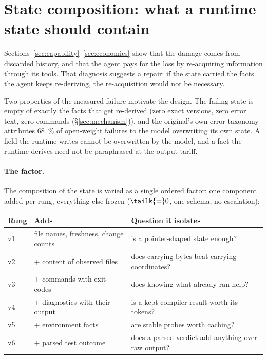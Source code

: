 %
%

\section{State composition: what a runtime state should contain}
\label{sec:composition}

Sections~\ref{sec:capability}--\ref{sec:economics} show that the damage comes
from discarded history, and that the agent pays for the loss by re-acquiring
information through its tools. That diagnosis suggests a repair: if the state
carried the facts the agent keeps re-deriving, the re-acquisition would not
be necessary.

Two properties of the measured failure motivate the design. The failing
state is empty of exactly the facts that get re-derived (zero exact versions,
zero error text, zero commands (\S\ref{sec:mechanism})), and the original's
own error taxonomy attributes \SI{68}{\percent} of open-weight failures to
the model overwriting its own state\origin. A field the runtime writes cannot
be overwritten by the model, and a fact the runtime derives need not be
paraphrased at the output tariff.

\paragraph{The factor.} The composition of the state is varied as a single
ordered factor: one component added per rung, everything else frozen
($\tailk{=}0$, one schema, no escalation):

\begin{center}
\begin{tabular}{@{}llp{7.2cm}@{}}
\toprule
Rung & Adds & Question it isolates \\
\midrule
v1 & file names, freshness, change counts & is a pointer-shaped state enough? \\
v2 & $+$ content of observed files        & does carrying bytes beat carrying coordinates? \\
v3 & $+$ commands with exit codes         & does knowing what already ran help? \\
v4 & $+$ diagnostics with their output    & is a kept compiler result worth its tokens? \\
v5 & $+$ environment facts                & are stable probes worth caching? \\
v6 & $+$ parsed test outcome              & does a parsed verdict add anything over raw output? \\
\bottomrule
\end{tabular}
\end{center}

